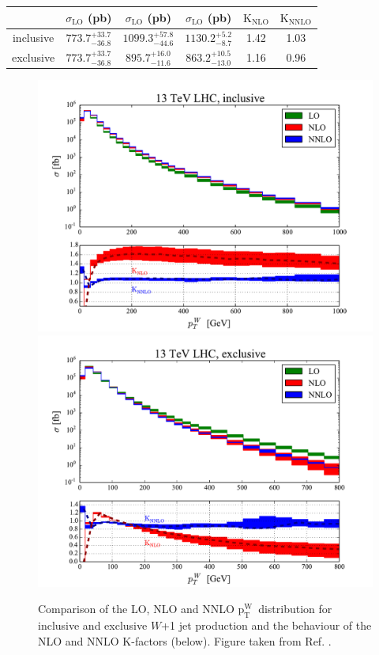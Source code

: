\documentclass[a4paper,11pt,notoc]{article}
\newcommand{\ptW}{\ensuremath{\mathrm{p_T^{W}}}}
\begin{document}
\begin{table}[tbh]
\centering
\begin{tabular}{|c|ccccc|} \hline
  & $\sigma_{\mathrm {LO}}$ (pb) & $\sigma_{\mathrm {LO}}$ (pb) & $\sigma_{\mathrm {LO}}$ (pb) & $\mathrm {K_{NLO}}$ & $\mathrm {K_{NNLO}}$ \\ \hline 
inclusive & $773.7^{+33.7}_{-36.8}$ & $1099.3^{+57.8}_{-44.6}$ & $1130.2^{+5.2}_{-8.7}$ & 1.42 & 1.03 \\
exclusive & $773.7^{+33.7}_{-36.8}$ & $895.7^{+16.0}_{-11.6}$ & $863.2^{+10.5}_{-13.0}$ & 1.16 & 0.96 \\
\hline
\end{tabular}
\label{tab:Wjet}
\end{table}

\begin{figure}[t!]
\centering
\includegraphics[width=0.495\columnwidth]{pTW_13TeV_incl.pdf} 
\includegraphics[width=0.495\columnwidth]{pTW_13TeV_excl.pdf} 
\caption{Comparison of the LO, NLO and NNLO \ptW\ distribution for inclusive and exclusive $W$+1 jet production and the behaviour of the NLO and NNLO K-factors (below). Figure taken from Ref. \cite{Boughezal:2016dtm}.}
\label{fig:Wpt}
\end{figure}   
\end{document}
